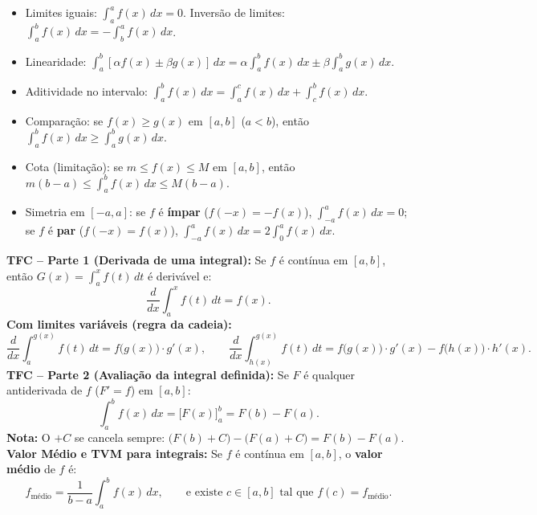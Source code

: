\documentclass[10pt,a4paper]{article}
\begin{document}
\begin{teo}
    \begin{itemize}
        \item Limites iguais: $\displaystyle \int_{a}^{a} f(x)\,dx = 0$. \qquad Inversão de limites: $\displaystyle \int_{a}^{b} f(x)\,dx = -\int_{b}^{a} f(x)\,dx$.
        \item Linearidade: $\displaystyle \int_{a}^{b} [\alpha f(x) \pm \beta g(x)]\,dx = \alpha \int_{a}^{b} f(x)\,dx \pm \beta \int_{a}^{b} g(x)\,dx$.
        \item Aditividade no intervalo: $\displaystyle \int_{a}^{b} f(x)\,dx = \int_{a}^{c} f(x)\,dx + \int_{c}^{b} f(x)\,dx$.
        \item Comparação: se $f(x) \ge g(x)$ em $[a,b]$ ($a<b$), então $\displaystyle \int_{a}^{b} f(x)\,dx \ge \int_{a}^{b} g(x)\,dx$.
        \item Cota (limitação): se $m \le f(x) \le M$ em $[a,b]$, então $\displaystyle m(b-a) \le \int_{a}^{b} f(x)\,dx \le M(b-a)$.
        \item Simetria em $[-a,a]$: se $f$ é \textbf{ímpar} ($f(-x)=-f(x)$), $\displaystyle \int_{-a}^{a} f(x)\,dx = 0$; \quad se $f$ é \textbf{par} ($f(-x)=f(x)$), $\displaystyle \int_{-a}^{a} f(x)\,dx = 2\int_{0}^{a} f(x)\,dx$.
    \end{itemize}
\end{teo}

\begin{teo}
    \textbf{TFC -- Parte 1 (Derivada de uma integral):} Se $f$ é contínua em $[a,b]$, então $\displaystyle G(x) = \int_{a}^{x} f(t)\,dt$ é derivável e:
    \[
        \frac{d}{dx}\int_{a}^{x} f(t)\,dt = f(x).
    \]
    \textbf{Com limites variáveis (regra da cadeia):}
    \[
        \frac{d}{dx}\int_{a}^{g(x)} f(t)\,dt = f\big(g(x)\big)\cdot g'(x), \qquad
        \frac{d}{dx}\int_{h(x)}^{g(x)} f(t)\,dt = f\big(g(x)\big)\cdot g'(x) - f\big(h(x)\big)\cdot h'(x).
    \]
    \textbf{TFC -- Parte 2 (Avaliação da integral definida):} Se $F$ é qualquer antiderivada de $f$ ($F' = f$) em $[a,b]$:
    \[
        \int_{a}^{b} f(x)\,dx = \Big[ F(x) \Big]_{a}^{b} = F(b) - F(a).
    \]
    \textbf{Nota:} O $+C$ se cancela sempre: $\big(F(b)+C\big) - \big(F(a)+C\big) = F(b) - F(a)$.\\[3pt]
    \textbf{Valor Médio e TVM para integrais:} Se $f$ é contínua em $[a,b]$, o \textbf{valor médio} de $f$ é:
    \[
        f_{\text{médio}} = \frac{1}{b - a}\int_{a}^{b} f(x)\,dx, \qquad \text{e existe } c \in [a,b] \text{ tal que } f(c) = f_{\text{médio}}.
    \]
\end{teo}
\end{document}

